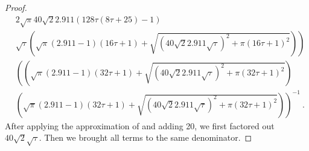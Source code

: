 \documentclass{article}
\begin{document}
\begin{proof}
\begin{align}
&\left.2 \sqrt{\pi } 40 \sqrt{2} 2.911 (128 \tau (8 \tau+25)-1)  \right.\\\nonumber 
&\left. \sqrt{\tau} \left(\sqrt{\pi } (2.911 -1) (16 \tau+1)+\sqrt{\left(40 \sqrt{2} 2.911 \sqrt{\tau}\right)^2+\pi  (16 \tau+1)^2}\right)\right)\\ \nonumber 
&\left(\left(\sqrt{\pi } (2.911 -1) (32  \tau+1)+\sqrt{\left(40 \sqrt{2} 2.911 \sqrt{\tau}\right)^2+\pi  (32  \tau+1)^2}\right)  \right.\\\nonumber 
&\left. \left(\sqrt{\pi } (2.911 -1) (32  \tau+1)+\sqrt{\left(40 \sqrt{2} 2.911 \sqrt{\tau}\right)^2+\pi  (32  \tau+1)^2}\right)\right)^{-1} \ .
\end{align}
After applying the approximation
of \citet{Ren:07} and adding 20,
we first factored out $40 \sqrt{2} \sqrt{\tau}$.
Then we brought all terms to the same denominator.


\end{proof}
\end{document}
